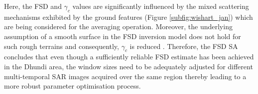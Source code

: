 \documentclass[review]{elsarticle}
\numberwithin{equation}{section}
\numberwithin{figure}{section}
\numberwithin{table}{section}
\begin{document}
Here, the FSD and $\gamma_c$ values are significantly influenced by the mixed scattering mechanisms exhibited by
the ground features (Figure \ref{subfig:wishart_jan}) which are being considered for the averaging operation. Moreover, the
underlying assumption of a smooth surface in the FSD inversion model does not hold for such rough terrains and consequently, $\gamma_c$ is reduced \citep{Leinss2014}. Therefore, the FSD SA concludes that even though a sufficiently reliable FSD estimate has been achieved in the Dhundi area, the window sizes need to be adequately adjusted for different multi-temporal SAR images acquired over the same region thereby leading to a more robust parameter optimisation process.

\begin{figure}[htb]
    \centering
    \begin{subfigure}[t]{0.49\textwidth}
        \caption{}
        \label{subfig:fwindow_mean}
    \end{subfigure}
    \hfill
    \begin{subfigure}[t]{0.49\textwidth}

\end{subfigure}
\end{figure}
\end{document}
